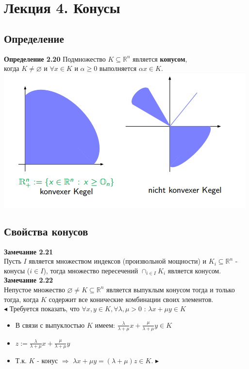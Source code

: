 \section{Лекция 4. Конусы}
\subsection{Определение}
\noindent\textbf{Определение 2.20}
Подмножество $K\subseteq \mathbb{R}^n$ является \textbf{конусом},\\
 когда $K\neq \varnothing$ и $\forall x\in K$ и $\alpha \geq 0$ выполняется $\alpha x \in K$.\\
 \includegraphics[scale=1]{kegel.png}
\subsection{Свойства конусов}
\noindent\textbf{Замечание 2.21}\\
Пусть $I$ является множеством индексов (произвольной мощности) и $K_{i}\subseteq \mathbb{R}^n$ - конусы ($i \in I$), тогда множество пересечений $\cap_{i \in I} K_{i}$ является конусом.\\

\noindent\textbf{Замечание 2.22}\\
Непустое множество $\varnothing \neq K \subseteq \mathbb{R}^n$ является выпуклым конусом тогда и только тогда, когда $K$ содержит все конические комбинации своих элементов.\\

\noindent$\blacktriangleleft$ Требуется показать, что $\forall x,y \in K, \forall \lambda,\mu >0$ : $\lambda x +\mu y \in K$\\
\begin{itemize}
\item В связи с выпуклостью $K$ имеем: $\displaystyle\frac{\lambda}{\lambda +\mu}x+ \frac{\mu}{\lambda +\mu}y \in K$
\item $\displaystyle z:=\frac{\lambda}{\lambda +\mu}x+ \frac{\mu}{\lambda +\mu}y$
\item Т.к. $K$ - конус $\Longrightarrow$ $\lambda x +\mu y=(\lambda +\mu)z \in K$. $\blacktriangleright$
\end{itemize}
